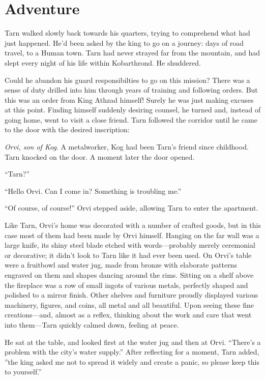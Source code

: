 \chapter{Adventure}
Tarn walked slowly back towards his quarters, trying to comprehend what had just happened.  He'd been asked by the king to go on a journey: days of road travel, to a Human town.  Tarn had never strayed far from the mountain, and had slept every night of his life within Kobarthrond.  He shuddered.

Could he abandon his guard responsibilties to go on this mission?  There was a sense of duty drilled into him through years of training and following orders.  But this was an order from King Athzad himself!  Surely he was just making excuses at this point.  Finding himself suddenly desiring counsel, he turned and, instead of going home, went to visit a close friend.  Tarn followed the corridor until he came to the door with the desired inscription:


\emph{Orvi, son of Kog}.  A metalworker, Kog had been Tarn's friend since childhood.  Tarn knocked on the door.  A moment later the door opened.

``Tarn?''

``Hello Orvi.  Can I come in?  Something is troubling me.''

``Of course, of course!''  Orvi stepped aside, allowing Tarn to enter the apartment.

Like Tarn, Orvi's home was decorated with a number of crafted goods, but in this case most of them had been made by Orvi himself.  Hanging on the far wall was a large knife, its shiny steel blade etched with words---probably merely ceremonial or decorative; it didn't look to Tarn like it had ever been used.  On Orvi's table were a fruitbowl and water jug, made from bronze with elaborate patterns engraved on them and shapes dancing around the rims.   Sitting on a shelf above the fireplace was a row of small ingots of various metals, perfectly shaped and polished to a mirror finish.  Other shelves and furniture proudly displayed various machinery, figures, and coins, all metal and all beautiful.  Upon seeing these fine creations---and, almost as a reflex, thinking about the work and care that went into them---Tarn quickly calmed down, feeling at peace.

He sat at the table, and looked first at the water jug and then at Orvi.  ``There's a problem with the city's water supply.''  After reflecting for a moment, Tarn added, ''the king asked me not to spread it widely and create a panic, so please keep this to yourself.''

